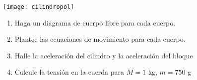 \begin{enumerate}
\begin{minipage}{9 cm}
\texttt{[image: cilindropol]}

\end{minipage}
\begin{minipage}{8 cm}
\begin{enumerate}
\item Haga un diagrama de cuerpo libre para cada cuerpo.
      \label{item:r3a}
\item Plantee las ecuaciones de movimiento para cada cuerpo.
      \label{item:r3b}
\item Halle la aceleración del cilindro y la aceleración del bloque
      \label{item:r3c}
\item Calcule la tensión en la cuerda para $M=1$ kg, $m=750$ g
      \label{item:r3d}
\end{enumerate}
\end{minipage}


\end{enumerate}
